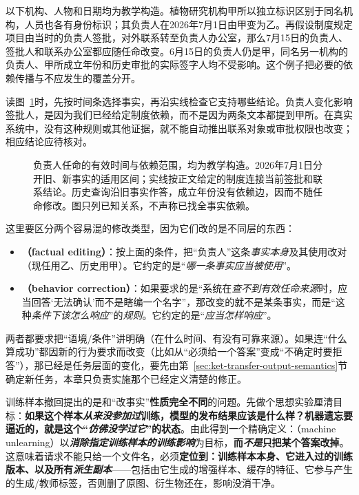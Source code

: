 以下机构、人物和日期均为教学构造。植物研究机构甲所以独立标识区别于同名机构，人员也各有身份标识；其负责人在2026年7月1日由甲变为乙。再假设制度规定项目由当时的负责人签批，对外联系转至负责人办公室，那么7月15日的负责人、签批人和联系办公室都应随任命改变。6月15日的负责人仍是甲，同名另一机构的负责人、甲所成立年份和历史审批的实际签字人均不受影响。这个例子把必要的依赖传播与不应发生的覆盖分开。

读图~\ref{fig:ket-update-time-scope}时，先按时间条选择事实，再沿实线检查它支持哪些结论。负责人变化影响签批人，是因为我们已经给定制度依赖，而不是因为两条文本都提到甲所。在真实系统中，没有这种规则或其他证据，就不能自动推出联系对象或审批权限也改变；相应结论应待核对。

\begin{figure}[htbp]
\centering

\caption{负责人任命的有效时间与依赖范围，均为教学构造。2026年7月1日分开旧、新事实的适用区间；实线按正文给定的制度连接当前签批和联系结论。历史查询沿旧事实作答，成立年份没有依赖边，因而不随任命修改。图只列已知关系，不声称已找全事实依赖。}
\label{fig:ket-update-time-scope}
\end{figure}

这里要区分两个容易混的修改类型，因为它们改的是不同层的东西：
\begin{itemize}\item \textbf{（factual editing）}：按上面的条件，把“负责人”这条\emph{事实本身}及其使用改对（现任用乙、历史用甲）。它约定的是“\emph{哪一条事实应当被使用}”。\item \textbf{（behavior correction）}：如果要求的是“系统在\emph{查不到有效任命来源}时，应当回答‘无法确认’而不是瞎编一个名字”，那改变的就不是某条事实，而是“这种\emph{条件下该\emph{怎么响应}}”的\emph{规则}。它约定的是“\emph{应当怎样响应}”。\end{itemize}
两者都要求把“语境/条件”讲明确（在什么时间、有没有可靠来源）。如果连“什么算成功”都因新的行为要求而改变（比如从“必须给一个答案”变成“不确定时要拒答”），那已经是任务层面的变化，要先由第~\ref{sec:ket-transfer-output-semantics}节确定新任务，本章只负责实施那个已经定义清楚的修正。

训练样本撤回提出的是和“改事实”\textbf{性质完全不同}的问题。先做个思想实验厘清目标：\textbf{如果这个样本\emph{从来没参加过}训练，模型的发布结果应该是什么样？机器遗忘要逼近的，就是这个“\emph{仿佛没学过它}”的状态}。由此得到一个精确定义：（machine unlearning）以\textbf{\emph{消除指定训练样本的\emph{训练影响}}}为目标，\textbf{而\emph{不是}只把某个答案改掉}。这意味着请求不能只给一个文件名，必须\textbf{定位到：训练样本本身、它进入过的训练版本、以及所有\emph{派生副本}}——包括由它生成的增强样本、缓存的特征、它参与产生的生成/教师标签，否则删了原图、衍生物还在，影响没消干净。

